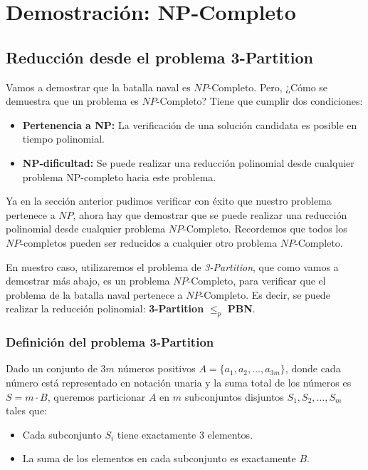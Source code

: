 \section{Demostración: NP-Completo}

\subsection*{Reducción desde el problema 3-Partition}

Vamos a demostrar que la batalla naval es $NP$-Completo. Pero, ¿Cómo se demuestra que un problema es $NP$-Completo? Tiene que cumplir dos condiciones: 

\begin{itemize}
    \item \textbf{Pertenencia a NP:} La verificación de una solución candidata es posible en tiempo polinomial.
    \item \textbf{NP-dificultad:} Se puede realizar una reducción polinomial desde cualquier problema NP-completo hacia este problema.
\end{itemize}

Ya en la sección anterior pudimos verificar con éxito que nuestro problema pertenece a $NP$, ahora hay que demostrar que se puede realizar una reducción polinomial desde cualquier problema $NP$-Completo. Recordemos que todos los $NP$-completos pueden ser reducidos a cualquier otro problema $NP$-Completo. 

En nuestro caso, utilizaremos el problema de \textit{3-Partition}, que como vamos a demostrar más abajo, es un problema $NP$-Completo, para verificar que el problema de la batalla naval pertenece a $NP$-Completo. Es decir, se puede realizar la reducción polinomial: \textbf{3-Partition} $\leq_p$ \textbf{PBN}.

\subsubsection*{Definición del problema 3-Partition}

Dado un conjunto de \(3m\) números positivos \(A = \{a_1, a_2, \dots, a_{3m}\}\), donde cada número está representado en notación unaria y la suma total de los números es \(S = m \cdot B\), queremos particionar \(A\) en \(m\) subconjuntos disjuntos \(S_1, S_2, \dots, S_m\) tales que:

\begin{itemize}
    \item Cada subconjunto \(S_i\) tiene exactamente 3 elementos.
    \item La suma de los elementos en cada subconjunto es exactamente \(B\).
\end{itemize}

